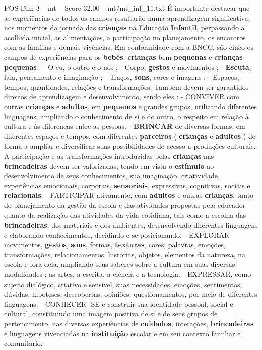 \begin{textsample}{POS Dim 3 – mt – Score 32.00 – mt/mt\_inf\_11.txt}
É importante destacar que as experiências de todos os campos resultarão numa aprendizagem significativa, nos momentos da jornada das \textbf{crianças} na Educação \textbf{Infantil}, perpassando a acolhida inicial, as alimentações, a participação no planejamento, os encontros com as famílias e demais vivências.
Em conformidade com a BNCC, são cinco os campos de experiências para os \textbf{bebês}, \textbf{crianças} bem \textbf{pequenas} e \textbf{crianças} \textbf{pequenas} : - O eu, o outro e o nós ; - Corpo, \textbf{gestos} e movimentos ; - \textbf{Escuta}, fala, pensamento e imaginação ; - Traços, \textbf{sons}, cores e imagens ; - Espaços, tempos, quantidades, relações e transformações.
Também devem ser garantidos direitos de aprendizagem e desenvolvimento, sendo eles : - CONVIVER com outras \textbf{crianças} e \textbf{adultos}, em \textbf{pequenos} e grandes grupos, utilizando diferentes linguagens, ampliando o conhecimento de si e do outro, o respeito em relação à cultura e às diferenças entre as pessoas. - \textbf{BRINCAR} de diversas formas, em diferentes espaços e tempos, com diferentes \textbf{parceiros} ( \textbf{crianças} e \textbf{adultos} ) de forma a ampliar e diversificar suas possibilidades de acesso a produções culturais.
A participação e as transformações introduzidas pelas \textbf{crianças} nas \textbf{brincadeiras} devem ser valorizadas, tendo em vista o \textbf{estímulo} ao desenvolvimento de seus conhecimentos, sua imaginação, criatividade, experiências emocionais, corporais, \textbf{sensoriais}, expressivas, cognitivas, sociais e \textbf{relacionais}. - PARTICIPAR ativamente, com \textbf{adultos} e outras \textbf{crianças}, tanto do planejamento da gestão da escola e das atividades propostas pelo educador quanto da realização das atividades da vida cotidiana, tais como a escolha das \textbf{brincadeiras}, dos materiais e dos ambientes, desenvolvendo diferentes linguagens e elaborando conhecimentos, decidindo e se posicionando. - EXPLORAR movimentos, \textbf{gestos}, \textbf{sons}, formas, \textbf{texturas}, cores, palavras, emoções, transformações, relacionamentos, histórias, objetos, elementos da natureza, na escola e fora dela, ampliando seus saberes sobre a cultura em suas diversas modalidades : as artes, a escrita, a ciência e a tecnologia. - EXPRESSAR, como sujeito dialógico, criativo e sensível, suas necessidades, emoções, sentimentos, dúvidas, hipóteses, descobertas, opiniões, questionamentos, por meio de diferentes linguagens. - CONHECER -SE e construir sua identidade pessoal, social e cultural, constituindo uma imagem positiva de si e de seus grupos de pertencimento, nas diversas experiências de \textbf{cuidados}, interações, \textbf{brincadeiras} e linguagens vivenciadas na \textbf{instituição} escolar e em seu contexto familiar e comunitário.

\end{textsample}
